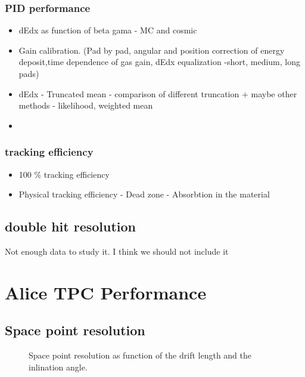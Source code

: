 \documentclass{elsart}
\begin{document}
\subsubsection{PID performance}
\begin{itemize} 
\item  dEdx as function of beta gama - MC and cosmic
\item  Gain calibration. (Pad by pad, angular and position correction of energy deposit,time dependence of gas gain, dEdx equalization -short, medium, long pads)
\item  dEdx - Truncated mean - comparison of different truncation + maybe other methods - likelihood, weighted mean
\item  
	
\end{itemize}


\subsubsection{tracking efficiency}
\begin{itemize} 
\item 100 \% tracking efficiency
\item Physical tracking efficiency - Dead zone - Absorbtion in the material
\end{itemize}

\subsection{ double hit resolution}
Not enough data to study it. I think we should not include it



\section{ Alice TPC Performance}


\subsection{Space point resolution}

\begin{figure}
  \centering{}
  \centering{}
  \caption{Space point resolution as function of the drift length and the inlination angle.}
  \label{figPointResolYDRTAN}
\end{figure}
\end{document}
